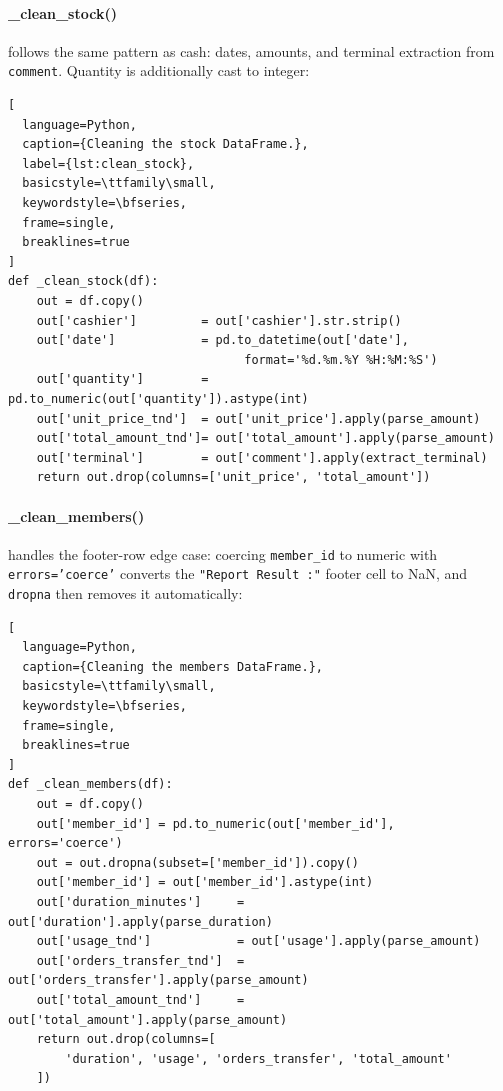 \paragraph{\_clean\_stock()} follows the same pattern as cash: dates, amounts, and
terminal extraction from \texttt{comment}. Quantity is additionally cast to integer:

\begin{lstlisting}[
  language=Python,
  caption={Cleaning the stock DataFrame.},
  label={lst:clean_stock},
  basicstyle=\ttfamily\small,
  keywordstyle=\bfseries,
  frame=single,
  breaklines=true
]
def _clean_stock(df):
    out = df.copy()
    out['cashier']         = out['cashier'].str.strip()
    out['date']            = pd.to_datetime(out['date'],
                                 format='%d.%m.%Y %H:%M:%S')
    out['quantity']        = pd.to_numeric(out['quantity']).astype(int)
    out['unit_price_tnd']  = out['unit_price'].apply(parse_amount)
    out['total_amount_tnd']= out['total_amount'].apply(parse_amount)
    out['terminal']        = out['comment'].apply(extract_terminal)
    return out.drop(columns=['unit_price', 'total_amount'])
\end{lstlisting}

\paragraph{\_clean\_members()} handles the footer-row edge case: coercing
\texttt{member\_id} to numeric with \texttt{errors='coerce'} converts the
\texttt{"Report Result\,:"} footer cell to NaN, and \texttt{dropna} then removes
it automatically:

\begin{lstlisting}[
  language=Python,
  caption={Cleaning the members DataFrame.},
  basicstyle=\ttfamily\small,
  keywordstyle=\bfseries,
  frame=single,
  breaklines=true
]
def _clean_members(df):
    out = df.copy()
    out['member_id'] = pd.to_numeric(out['member_id'], errors='coerce')
    out = out.dropna(subset=['member_id']).copy()
    out['member_id'] = out['member_id'].astype(int)
    out['duration_minutes']     = out['duration'].apply(parse_duration)
    out['usage_tnd']            = out['usage'].apply(parse_amount)
    out['orders_transfer_tnd']  = out['orders_transfer'].apply(parse_amount)
    out['total_amount_tnd']     = out['total_amount'].apply(parse_amount)
    return out.drop(columns=[
        'duration', 'usage', 'orders_transfer', 'total_amount'
    ])
\end{lstlisting}

